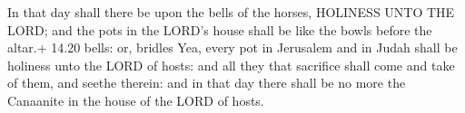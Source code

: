  In that day shall there be upon the bells of the horses,
HOLINESS UNTO THE LORD; and the pots in the LORD's house shall be like
the bowls before the altar.+ 14.20 bells: or, bridles 
Yea, every pot in Jerusalem and in Judah shall be holiness unto the LORD
of hosts: and all they that sacrifice shall come and take of them, and
seethe therein: and in that day there shall be no more the Canaanite in
the house of the LORD of hosts.
